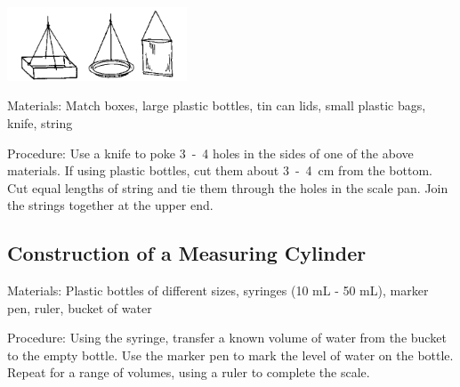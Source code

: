 \begin{multicols}{2}
\begin{center}
\includegraphics[width=0.4\textwidth]{./img/source/scale-pans.png}
\end{center}

\begin{description*}
\item[Materials:]{Match boxes, large plastic bottles, tin can lids, small plastic bags, knife, string}
\item[Procedure:]{Use a knife to poke 3~-~4 holes in the sides of one of the above materials. If using plastic bottles, cut them about 3~-~4~cm from the bottom. Cut equal lengths of string and tie them through the holes in the scale pan. Join the strings together at the upper end. }
\end{description*}

\subsection{Construction of a Measuring Cylinder} 
\label{sub:meascyl}


\begin{description*}
\item[Materials:]{Plastic bottles of different sizes, syringes (10 mL - 50 mL), marker pen, ruler, bucket of water}
\item[Procedure:]{Using the syringe, transfer a known volume of water from the bucket to the empty bottle. Use the marker pen to mark the level of water on the bottle. Repeat for a range of volumes, using a ruler to complete the scale.}
\end{description*}


\end{multicols}
